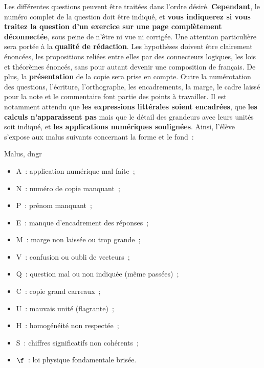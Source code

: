 \documentclass[11pt]{book}
\begin{document}
{Les différentes questions peuvent être traitées dans l'ordre désiré.
\textbf{Cependant}, le numéro complet de la question doit être indiqué, et
\textbf{vous indiquerez si vous traitez la question d'un exercice sur une page
	complètement déconnectée}, sous peine de n'être ni vue ni corrigée.
\bigbreak
Une attention particulière sera portée à la \textbf{qualité de rédaction}. Les
hypothèses doivent être clairement énoncées, les propositions reliées entre
elles par des connecteurs logiques, les lois et théorèmes énoncés, sans pour
autant devenir une composition de français.
\bigbreak
De plus, la \textbf{présentation} de la copie sera prise en compte. Outre la
numérotation des questions, l'écriture, l'orthographe, les encadrements, la
marge, le cadre laissé pour la note et le commentaire font partie des points à
travailler. Il est notamment attendu que \textbf{les expressions littérales
	soient encadrées}, que \textbf{les calculs n'apparaissent pas} mais que le
détail des grandeurs avec leurs unités soit indiqué, et \textbf{les applications
	numériques soulignées}.
\bigbreak
Ainsi, l'élève s'expose aux malus suivants concernant la forme et le fond~:
\begin{tprop}{Malus, dngr}
	\begin{minipage}{0.50\linewidth}
		\begin{itemize}
			\item A~: application numérique mal faite~;
			\item N~: numéro de copie manquant~;
			\item P~: prénom manquant~;
			\item E~: manque d'encadrement des réponses~;
			\item M~: marge non laissée ou trop grande~;
			\item V~: confusion ou oubli de vecteurs~;
		\end{itemize}
	\end{minipage}
	\begin{minipage}{0.50\linewidth}
		\begin{itemize}
			\item Q~: question mal ou non indiquée (même passées)~;
			\item C~: copie grand carreaux~;
			\item U~: mauvais unité (flagrante)~;
			\item H~: homogénéité non respectée~;
			\item S~: chiffres significatifs non cohérents~;
			\item $\f$~: loi physique fondamentale brisée.
		\end{itemize}
	\end{minipage}
\end{tprop}

}
\end{document}
